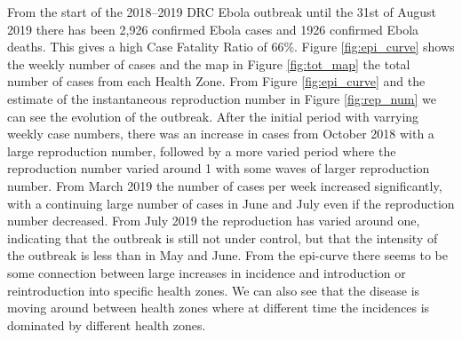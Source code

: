 \documentclass[12pt]{article}
\begin{document}
From the start of the 2018--2019 DRC Ebola outbreak until the 31st of August 2019 there has been 2,926 confirmed Ebola cases and 1926 confirmed Ebola deaths. This gives a high Case Fatality Ratio of 66\%. Figure \ref{fig:epi_curve} shows the weekly number of cases and the map in Figure \ref{fig:tot_map} the total number of cases from each Health Zone. From Figure \ref{fig:epi_curve} and the estimate of the instantaneous reproduction number in Figure \ref{fig:rep_num} we can see the evolution of the outbreak. After the initial period with varrying weekly case numbers, there was an increase in cases from October 2018 with a large reproduction number, followed by a more varied period where the reproduction number varied around 1 with some waves of larger reproduction number. From March 2019 the number of cases per week increased significantly, with a continuing large number of cases in June and July even if the reproduction number decreased. From July 2019 the reproduction has varied around one, indicating that the outbreak is still not under control, but that the intensity of the outbreak is less than in May and June. From the epi-curve there seems to be some connection between large increases in incidence and introduction or reintroduction into specific health zones. We can also see that the disease is moving around between health zones where at different time the incidences is dominated by different health zones. 
\end{document}
